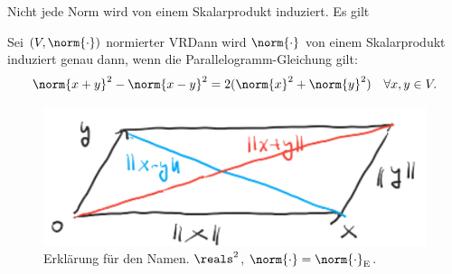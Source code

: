 Nicht jede Norm wird von einem Skalarprodukt induziert. Es gilt
\begin{lemma}
    Sei \( (V,\norm{\cdot}) \) normierter VR\@ Dann wird \( \norm{\cdot} \) von einem Skalarprodukt induziert genau dann, wenn die Parallelogramm-Gleichung gilt:
    \begin{align*}
        \norm{x+y}^2-\norm{x-y}^2=2(\norm{x}^2+\norm{y}^2)\quad \forall x,y\in V.
    \end{align*}
    \begin{figure}[H]
        \centering
        \includegraphics[width=0.5\linewidth]{figures/parallelogramm_gleichung_namenserklaerung}
        \caption*{Erklärung für den Namen. \( \reals^2 \), \( \norm{\cdot}=\norm{\cdot}_{\text{E}} \).}
        \label{fig:parallelogramm_gleichung_namenserklaerung}
    \end{figure}    
\end{lemma}
